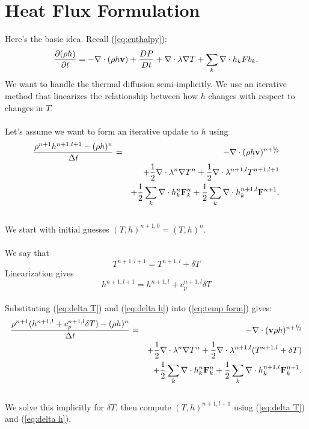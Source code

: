 \documentclass[final]{siamltex}
\newcommand{\sfrac}[2]{\mathchoice
  {\kern0em\raise.5ex\hbox{\the\scriptfont0 #1}\kern-.15em/
   \kern-.15em\lower.25ex\hbox{\the\scriptfont0 #2}}
  {\kern0em\raise.5ex\hbox{\the\scriptfont0 #1}\kern-.15em/
   \kern-.15em\lower.25ex\hbox{\the\scriptfont0 #2}}
  {\kern0em\raise.5ex\hbox{\the\scriptscriptfont0 #1}\kern-.2em/
   \kern-.15em\lower.25ex\hbox{\the\scriptscriptfont0 #2}}
  {#1\!/#2}}
\def\Fb {{\bf F}}
\def\vb {{\bf v}}
\def\half   {\frac{1}{2}}
\def\myhalf {\sfrac{1}{2}}
\begin{document}
\section{Heat Flux Formulation}
Here's the basic idea.  Recall (\ref{eq:enthalpy}):
\begin{equation}
\frac{\partial(\rho h)}{\partial t} = -\nabla\cdot(\rho h\vb) + \frac{DP}{Dt} + \nabla\cdot\lambda\nabla T + \sum_k\nabla\cdot h_kFb_k.
\end{equation}
We want to handle the thermal diffusion semi-implicitly.  We use an iterative method that
linearizes the relationship between how $h$ changes with respect to changes in $T$.\\ \\
Let's assume we want to form an iterative update to $h$ using
\begin{eqnarray}
\frac{\rho^{n+1}h^{n+1,l+1} - (\rho h)^n}{\Delta t} &=& -\nabla\cdot(\rho h\vb)^{n+\myhalf}\nonumber\\
&&+ \half\nabla\cdot\lambda^n\nabla T^n + \half\nabla\cdot\lambda^{n+1,l}T^{n+1,l+1}\nonumber\\
&& + \half\sum_k\nabla\cdot h_k^n\Fb_k^n + \half\sum_k\nabla\cdot h_k^{n+1,l}\Fb^{n+1}.\label{eq:temp form}
\end{eqnarray}
\\
We start with initial guesses $(T,h)^{n+1,0} = (T,h)^n$.\\ \\
We say that
\begin{equation}
T^{n+1,l+1} = T^{n+1,l} + \delta T\label{eq:delta T}
\end{equation}
Linearization gives
\begin{equation}
h^{n+1,l+1} = h^{n+1,l} + c_p^{n+1,l}\delta T\label{eq:delta h}
\end{equation}
\\
Substituting (\ref{eq:delta T}) and (\ref{eq:delta h}) into (\ref{eq:temp form}) gives:
\begin{eqnarray}
\frac{\rho^{n+1}(h^{n+1,l} + c_p^{n+1,l}\delta T) - (\rho h)^n}{\Delta t} &=& -\nabla\cdot(\vb\rho h)^{n+\myhalf}\nonumber\\
&&+ \half\nabla\cdot\lambda^n\nabla T^n + \half\nabla\cdot\lambda^{n+1,l}(T^{n+1,l} + \delta T)\nonumber\\
&& + \half\sum_k\nabla\cdot h_k^n\Fb_k^n + \half\sum_k\nabla\cdot h_k^{n+1,l}\Fb_k^{n+1}.
\end{eqnarray}
\\
We solve this implicitly for $\delta T$, then compute $(T,h)^{n+1,l+1}$
using (\ref{eq:delta T}) and (\ref{eq:delta h}).\\
\end{document}
